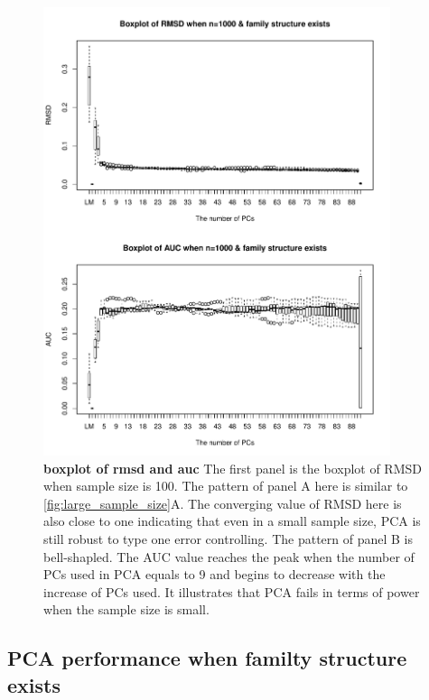\documentclass[11pt]{article}
\begin{document}
\begin{figure}[bp!]
  \centering
  \includegraphics[width=4in]{PCA_n_1000_m_100_family_structure.pdf}
  \caption{
    {\bf boxplot of rmsd and auc}
    The first panel is the boxplot of RMSD when sample size is 100.
    The pattern of panel A here is similar to \cref{fig:large_sample_size}A.
    The converging value of RMSD here is also close to one indicating that even in a small sample size, PCA is still robust to type one error controlling.
    The pattern of panel B is bell-shapled.
    The AUC value reaches the peak when the number of PCs used in PCA equals to 9 and begins to decrease with the increase of PCs used.
    It illustrates that PCA fails in terms of power when the sample size is small.
  }
  \label{fig:family_structure}
\end{figure}

\subsection{PCA performance when familty structure exists}
\end{document}
